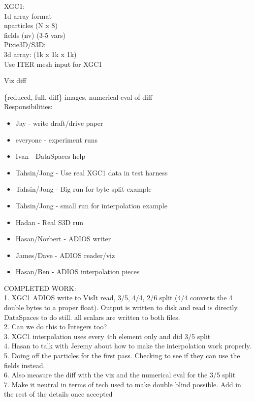 \documentclass{sig-alt-gov2}
\begin{document}
XGC1:\\
1d array format\\
nparticles (N x 8)\\
fields (nv) (3-5 vars)\\

Pixie3D/S3D:\\
3d array: (1k x 1k x 1k)\\

Use ITER mesh input for XGC1

Viz diff

\{reduced, full, diff\} images, numerical eval of diff\\

Responsibilities:
\begin{itemize}
\item Jay - write draft/drive paper
\item everyone - experiment runs
\item Ivan - DataSpaces help
\item Tahsin/Jong - Use real XGC1 data in test harness
\item Tahsin/Jong - Big run for byte split example
\item Tahsin/Jong - small run for interpolation example
\item Hadan - Real S3D run
\item Hasan/Norbert - ADIOS writer
\item James/Dave - ADIOS reader/viz
\item Hasan/Ben - ADIOS interpolation pieces
\end{itemize}

COMPLETED WORK:\\
1. XGC1 ADIOS write to VisIt read, 3/5, 4/4, 2/6 split (4/4 converts the 4 double bytes to a proper float). Output is written to disk and read is directly. DataSpaces to do still. all scalars are written to both files.\\
2. Can we do this to Integers too?\\
3. XGC1 interpolation uses every 4th element only and did 3/5 split\\
4. Hasan to talk with Jeremy about how to make the interpolation work properly.
5. Doing off the particles for the first pass. Checking to see if they can use the fields instead.\\
6. Also measure the diff with the viz and the numerical eval for the 3/5 split\\
7. Make it neutral in terms of tech used to make double blind possible. Add in
the rest of the details once accepted\\
\end{document}
